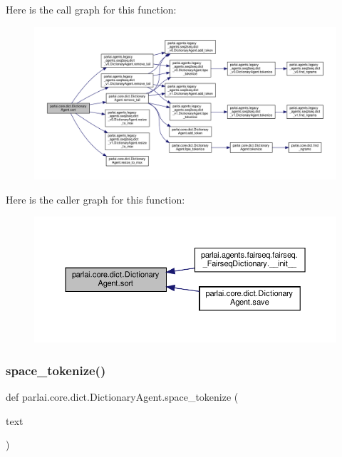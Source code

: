 Here is the call graph for this function\+:
\nopagebreak
\begin{figure}[H]
\begin{center}
\leavevmode
\includegraphics[width=350pt]{classparlai_1_1core_1_1dict_1_1DictionaryAgent_a84cb4fabf5d0e92e3f80ac16bdfd0ccc_cgraph}
\end{center}
\end{figure}
Here is the caller graph for this function\+:
\nopagebreak
\begin{figure}[H]
\begin{center}
\leavevmode
\includegraphics[width=350pt]{classparlai_1_1core_1_1dict_1_1DictionaryAgent_a84cb4fabf5d0e92e3f80ac16bdfd0ccc_icgraph}
\end{center}
\end{figure}
\mbox{\label{classparlai_1_1core_1_1dict_1_1DictionaryAgent_a437d3aacc7b55dac587643b271ba5f38}} 
\subsubsection{\texorpdfstring{space\+\_\+tokenize()}{space\_tokenize()}}
{\footnotesize\ttfamily def parlai.\+core.\+dict.\+Dictionary\+Agent.\+space\+\_\+tokenize (\begin{DoxyParamCaption}\item[{}]{text }\end{DoxyParamCaption})\hspace{0.3cm}{\ttfamily [static]}}

